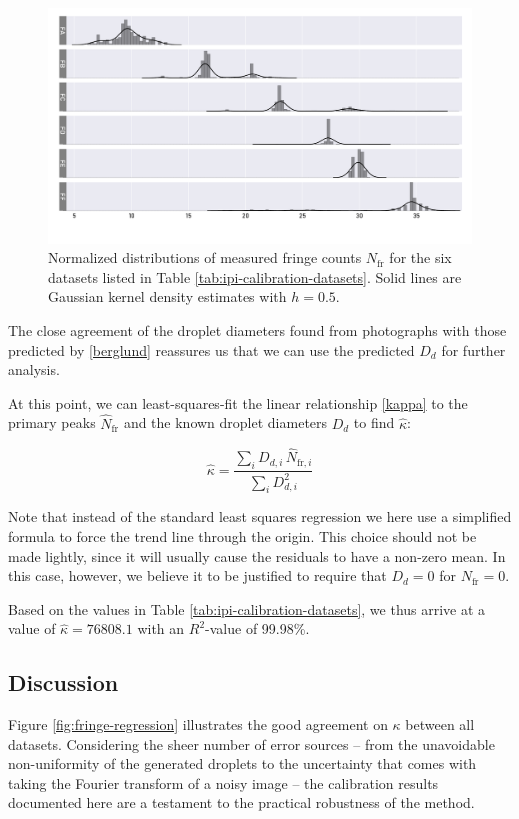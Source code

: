 \documentclass[11.5pt]{book}
\begin{document}
\begin{figure}
    \centering
    \includegraphics[width=\textwidth]{img/fringe_histogram.pdf}
    \caption{Normalized distributions of measured fringe counts $N_\text{fr}$
        for the six datasets listed in Table \ref{tab:ipi-calibration-datasets}. Solid lines are
Gaussian kernel density estimates with $h=0.5$. }
    \label{fig:fringe-histograms}
\end{figure}

The close agreement of the droplet diameters found from photographs with those
predicted by \eqref{berglund} reassures us that we can use the predicted $D_d$
for further analysis.

At this point, we can least-squares-fit the linear relationship \eqref{kappa} to the primary
peaks $\hat{N}_\text{fr}$ and the known droplet diameters $D_d$ to find
$\hat{\kappa}$:

\begin{equation}
    \hat{\kappa} = \frac{\sum_i D_{d,i} \, \hat{N}_{\text{fr}, i}}{\sum_i
    D_{d,i}^2}
\end{equation}

Note that instead of the standard least squares regression we here use a
simplified formula to force the trend line through the origin. This choice
should not be made lightly, since it will usually cause the residuals to have a
non-zero mean. In this case, however, we believe it to be justified to require
that $D_d = 0$ for $N_\text{fr} = 0$.

Based on the values in Table \ref{tab:ipi-calibration-datasets}, we thus arrive
at a value of $\hat{\kappa} = 76808.1$ with an $R^2$-value of 99.98\%. 

\subsection{Discussion}
Figure \ref{fig:fringe-regression} illustrates the good agreement on $\kappa$ between
all datasets. Considering the sheer number of error sources -- from the
unavoidable non-uniformity of the generated droplets to the uncertainty that
comes with taking the Fourier transform of a noisy image -- the calibration
results documented here are a testament to the practical robustness of the
method.
\end{document}
